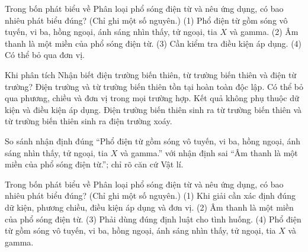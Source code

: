 \begin{ex}
Trong bốn phát biểu về Phân loại phổ sóng điện từ và nêu ứng dụng, có bao nhiêu phát biểu đúng? (Chỉ ghi một số nguyên.) (1) Phổ điện từ gồm sóng vô tuyến, vi ba, hồng ngoại, ánh sáng nhìn thấy, tử ngoại, tia $X$ và gamma. (2) Âm thanh là một miền của phổ sóng điện từ. (3) Cần kiểm tra điều kiện áp dụng. (4) Có thể bỏ qua đơn vị.
\end{ex}

\begin{ex}
Khi phân tích Nhận biết điện trường biến thiên, từ trường biến thiên và điện từ trường?
\choice
{Điện trường và từ trường biến thiên tồn tại hoàn toàn độc lập.}
{Có thể bỏ qua phương, chiều và đơn vị trong mọi trường hợp.}
{Kết quả không phụ thuộc dữ kiện và điều kiện áp dụng.}
{\True Điện trường biến thiên sinh ra từ trường biến thiên và từ trường biến thiên sinh ra điện trường xoáy.}
\end{ex}

\begin{bt}
So sánh nhận định đúng “Phổ điện từ gồm sóng vô tuyến, vi ba, hồng ngoại, ánh sáng nhìn thấy, tử ngoại, tia $X$ và gamma.” với nhận định sai “Âm thanh là một miền của phổ sóng điện từ.”; chỉ rõ căn cứ Vật lí.
\end{bt}

\begin{ex}
Trong bốn phát biểu về Phân loại phổ sóng điện từ và nêu ứng dụng, có bao nhiêu phát biểu đúng? (Chỉ ghi một số nguyên.) (1) Khi giải cần xác định đúng dữ kiện, phương chiều, điều kiện áp dụng và đơn vị. (2) Âm thanh là một miền của phổ sóng điện từ. (3) Phải dùng đúng định luật cho tình huống. (4) Phổ điện từ gồm sóng vô tuyến, vi ba, hồng ngoại, ánh sáng nhìn thấy, tử ngoại, tia $X$ và gamma.
\end{ex}

